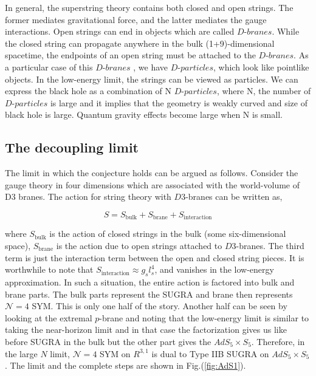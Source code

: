 In general, the superstring theory contains both closed and open strings. The former mediates gravitational force, and the latter mediates the gauge interactions. 
Open strings can end in objects which are called $\textit{D-branes}$. While the closed string can propagate anywhere in the bulk (1+9)-dimensional spacetime, 
the endpoints of an open string must be attached to the $\textit{D-branes}$.  As a particular case of this $\textit{D-branes }$, we have $\textit{D-particles}$, 
which look like pointlike objects. In the low-energy limit, the strings can be viewed as particles. We can express the black hole as a combination of N $\textit{D-particles}$, 
where N, the number of $\textit{D-particles}$ is large and it implies that the geometry is weakly curved and size of black hole is large. Quantum gravity effects become
large when N is small. 



\subsection{The decoupling limit} 

The limit in which the conjecture holds can be argued as follows. Consider the gauge theory in four dimensions which are associated with the world-volume of D3 branes. 
The action for string theory with $D3$-branes can be written as, 

\begin{equation}
S = S_{\text{bulk}} + S_{\text{brane}}  + S_{\text{interaction}} 
\end{equation}

where $ S_{\text{bulk}}$ is the action of closed strings in the bulk (some six-dimensional space), 
$S_{\text{brane}}$ is the action due to open strings attached to $D3$-branes. The third term is just the interaction term between
the open and closed string pieces. It is worthwhile to note that $S_{\text{interaction}} \approx g_{s} l_{s}^4$, and vanishes
in the low-energy approximation. In such a situation, the entire action is factored into bulk and brane parts. 
The bulk parts represent the SUGRA and brane then represents $\mathcal{N}=4$ SYM. 
This is only one half of the story. Another half can be seen by looking at the extremal $p$-brane 
and noting that the low-energy limit is similar to taking the near-horizon limit and in that case the 
factorization gives us like before SUGRA in the bulk
but the other part gives the $AdS_{5} \times S_{5}$. 
Therefore, in the large $N$ limit, $\mathcal{N}=4$ SYM on $R^{3,1}$ is dual to Type IIB SUGRA on $AdS_{5} \times S_{5}$. 
The limit and the complete steps are shown in Fig.(\ref{fig:AdS1}). 

